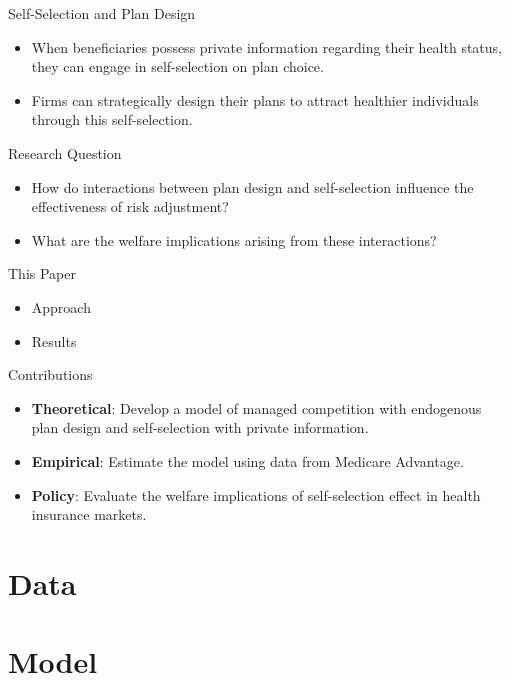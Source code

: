 \documentclass[professionalfonts, aspectratio=169]{beamer}
\begin{document}
\begin{frame}{Self-Selection and Plan Design}
  \begin{itemize}
    \item When beneficiaries possess private information regarding their health status, they can engage in self-selection on plan choice.
    \item Firms can strategically design their plans to attract healthier individuals through this self-selection.
  \end{itemize}
\end{frame}

\begin{frame}{Research Question}
  \begin{itemize}
    \item How do interactions between plan design and self-selection influence the effectiveness of risk adjustment?
    \item What are the welfare implications arising from these interactions?
  \end{itemize}
\end{frame}

\begin{frame}{This Paper}
  \begin{itemize}
    \item Approach
    \item Results
  \end{itemize}
\end{frame}

\begin{frame}{Contributions}
  \begin{itemize}
    \item \textbf{Theoretical}: Develop a model of managed competition with endogenous plan design and self-selection with private information.
    \item \textbf{Empirical}: Estimate the model using data from Medicare Advantage.
    \item \textbf{Policy}: Evaluate the welfare implications of self-selection effect in health insurance markets.
  \end{itemize}
\end{frame}

\section{Data}
\section{Model}
\end{document}
